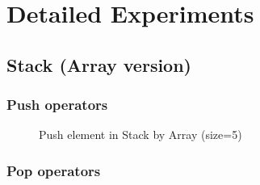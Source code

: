 \section{Detailed Experiments}

\subsection{Stack (Array version)}

\subsubsection{Push operators}

\begin{figure}[H]
    \centering
    \qquad
    \caption{Push element in Stack by Array (size=5)}%
    \label{fig:stackArrayPush}%
\end{figure}
\subsubsection{Pop operators}

